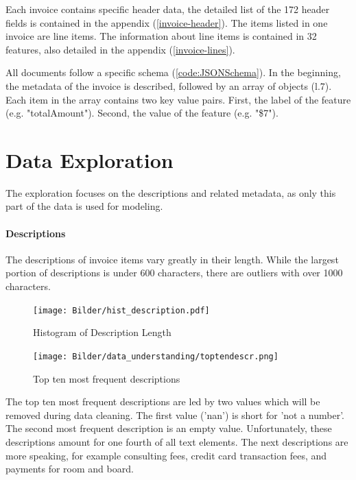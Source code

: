 Each invoice contains specific header data, the detailed list of the 172 header fields is contained in the appendix (\ref{invoice-header}). 
The items listed in one invoice are line items. The information about line items is contained in 32 features, also detailed in the appendix (\ref{invoice-lines}).

All documents follow a specific schema (\ref{code:JSONSchema}). In the beginning, the metadata of the invoice is described, followed by an array of objects (l.7). Each item in the array contains two key value pairs. First, the label of the feature (e.g. "totalAmount"). Second, the value of the feature (e.g. "\$7").






\section{Data Exploration}
The exploration focuses on the descriptions and related metadata, as only this part of the data is used for modeling.
\paragraph{Descriptions}
The descriptions of invoice items vary greatly in their length. While the largest portion of descriptions is under 600 characters, there are outliers with over 1000 characters. 
\begin{figure}[h!]
	\centering
	\texttt{[image: Bilder/hist\_description.pdf]}
	\caption{Histogram of Description Length}
	\label{fig:descr-length}
\end{figure}

\begin{figure}[!h]
	\centering
	\texttt{[image: Bilder/data\_understanding/toptendescr.png]}
	\caption{Top ten most frequent descriptions}
	\label{fig:descr-most-frequent}
\end{figure}
The top ten most frequent descriptions are led by two values which will be removed during data cleaning. The first value ('nan') is short for 'not a number'. The second most frequent description is an empty value. Unfortunately, these descriptions amount for one fourth of all text elements. The next descriptions are more speaking, for example consulting fees, credit card transaction fees, and payments for room and board.

